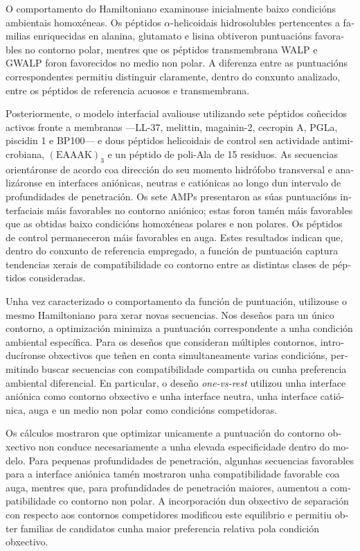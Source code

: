 \begin{otherlanguage}{galician}
O comportamento do Hamiltoniano examinouse inicialmente baixo condicións ambientais homoxéneas. Os péptidos $\alpha$-helicoidais hidrosolubles pertencentes a familias enriquecidas en alanina, glutamato e lisina obtiveron puntuacións favorables no contorno polar, mentres que os péptidos transmembrana WALP e GWALP foron favorecidos no medio non polar. A diferenza entre as puntuacións correspondentes permitiu distinguir claramente, dentro do conxunto analizado, entre os péptidos de referencia acuosos e transmembrana.

Posteriormente, o modelo interfacial avaliouse utilizando sete péptidos coñecidos activos fronte a membranas —LL-37, melittin, magainin-2, cecropin A, PGLa, piscidin 1 e BP100— e dous péptidos helicoidais de control sen actividade antimicrobiana, $(\mathrm{EAAAK})_3$ e un péptido de poli-Ala de 15 residuos. As secuencias orientáronse de acordo coa dirección do seu momento hidrófobo transversal e analizáronse en interfaces aniónicas, neutras e catiónicas ao longo dun intervalo de profundidades de penetración. Os sete AMPs presentaron as súas puntuacións interfaciais máis favorables no contorno aniónico; estas foron tamén máis favorables que as obtidas baixo condicións homoxéneas polares e non polares. Os péptidos de control permaneceron máis favorables en auga. Estes resultados indican que, dentro do conxunto de referencia empregado, a función de puntuación captura tendencias xerais de compatibilidade co contorno entre as distintas clases de péptidos consideradas.

Unha vez caracterizado o comportamento da función de puntuación, utilizouse o mesmo Hamiltoniano para xerar novas secuencias. Nos deseños para un único contorno, a optimización minimiza a puntuación correspondente a unha condición ambiental específica. Para os deseños que consideran múltiples contornos, introducíronse obxectivos que teñen en conta simultaneamente varias condicións, permitindo buscar secuencias con compatibilidade compartida ou cunha preferencia ambiental diferencial. En particular, o deseño \textit{one-vs-rest} utilizou unha interface aniónica como contorno obxectivo e unha interface neutra, unha interface catiónica, auga e un medio non polar como condicións competidoras.

Os cálculos mostraron que optimizar unicamente a puntuación do contorno obxectivo non conduce necesariamente a unha elevada especificidade dentro do modelo. Para pequenas profundidades de penetración, algunhas secuencias favorables para a interface aniónica tamén mostraron unha compatibilidade favorable coa auga, mentres que, para profundidades de penetración maiores, aumentou a compatibilidade co contorno non polar. A incorporación dun obxectivo de separación con respecto aos contornos competidores modificou este equilibrio e permitiu obter familias de candidatos cunha maior preferencia relativa pola condición obxectivo.


\end{otherlanguage}
